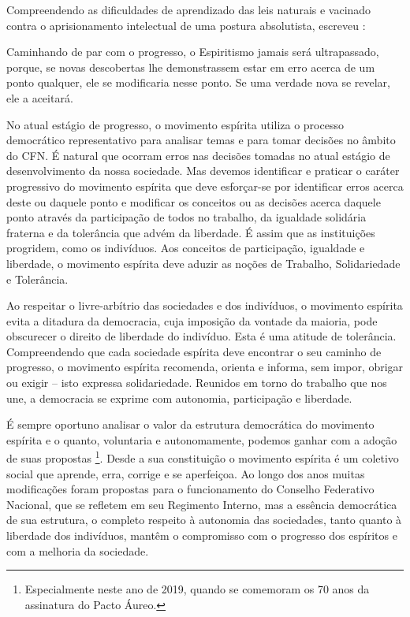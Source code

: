 Compreendendo as dificuldades de aprendizado das leis naturais e vacinado contra o aprisionamento intelectual de uma postura absolutista, escreveu :

\begin{citacao}
	Caminhando de par com o progresso, o Espiritismo jamais será ultrapassado, porque, se novas descobertas lhe demonstrassem estar em erro acerca de um ponto qualquer, ele se modificaria nesse ponto. Se uma verdade nova se revelar, ele a aceitará.

\end{citacao}

No atual estágio de progresso, o movimento espírita utiliza o processo democrático representativo para analisar temas e para tomar decisões no âmbito do CFN. É natural que ocorram erros nas decisões tomadas no atual estágio de desenvolvimento da nossa sociedade. Mas devemos identificar e praticar o caráter progressivo do movimento espírita que deve esforçar-se por identificar erros acerca deste ou daquele ponto e modificar os conceitos ou as decisões acerca daquele ponto através da participação de todos no trabalho, da igualdade solidária fraterna e da tolerância que advém da liberdade. É assim que as instituições progridem, como os indivíduos. Aos conceitos de participação, igualdade e liberdade, o movimento espírita deve aduzir as noções de Trabalho, Solidariedade e Tolerância.

Ao respeitar o livre-arbítrio das sociedades e dos indivíduos, o movimento espírita evita a ditadura da democracia, cuja imposição da vontade da maioria, pode obscurecer o direito de liberdade do indivíduo. Esta é uma atitude de tolerância. Compreendendo que cada sociedade espírita deve encontrar o seu caminho de progresso, o movimento espírita recomenda, orienta e informa, sem impor, obrigar ou exigir -- isto expressa solidariedade. Reunidos em torno do trabalho que nos une, a democracia se exprime com autonomia, participação e liberdade.
 

É sempre oportuno analisar o valor da estrutura democrática do movimento espírita e o quanto, voluntaria e autonomamente, podemos ganhar com a adoção de suas propostas \footnote{Especialmente neste ano de 2019, quando se comemoram os 70 anos da assinatura do Pacto Áureo.}. Desde a sua constituição o movimento espírita é um coletivo social que aprende, erra, corrige e se aperfeiçoa. Ao longo dos anos muitas modificações foram propostas para o funcionamento do Conselho Federativo Nacional, que se refletem em seu Regimento Interno, mas a essência democrática de sua estrutura, o completo respeito à autonomia das sociedades, tanto quanto  à liberdade dos indivíduos,  mantêm o compromisso com o progresso dos espíritos e com a melhoria da sociedade. 

